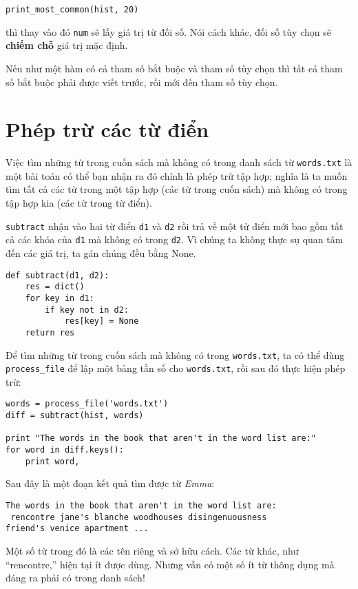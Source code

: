 \documentclass[11pt]{book}
\begin{document}
\beforeverb
\begin{verbatim}
print_most_common(hist, 20)
\end{verbatim}
\afterverb

thì thay vào đó {\tt num} sẽ lấy giá trị từ đối số. Nói cách khác,
đối số tùy chọn sẽ {\bf chiếm chỗ} giá trị mặc định.


Nếu như một hàm có cả tham số bắt buộc và tham số tùy chọn thì
tất cả tham số bắt buộc phải được viết trước, rồi mới đến tham số
tùy chọn.


\section{Phép trừ các từ điển}


Việc tìm những từ trong cuốn sách mà không có trong danh sách từ
{\tt words.txt} là một bài toán có thể bạn nhận ra đó chính là 
phép trừ tập hợp; nghĩa là ta muốn tìm tất cả các từ trong một 
tập hợp (các từ trong cuốn sách) mà không có trong tập hợp kia
(các từ trong từ điển).

{\tt subtract} nhận vào hai từ điển {\tt d1} và {\tt d2} rồi trả về
một tử điển mới bao gồm tất cả các khóa của {\tt d1} mà không có
trong {\tt d2}.  Vì chúng ta không thực sụ quan tâm đến các 
giá trị, ta gán chúng đều bằng None.

\beforeverb
\begin{verbatim}
def subtract(d1, d2):
    res = dict()
    for key in d1:
        if key not in d2:
            res[key] = None
    return res
\end{verbatim}
\afterverb
%
Để tìm những từ trong cuốn sách mà không có trong {\tt words.txt},
ta có thể dùng \verb"process_file" để lập một bảng tần số cho
{\tt words.txt}, rồi sau đó thực hiện phép trừ:

\beforeverb
\begin{verbatim}
words = process_file('words.txt')
diff = subtract(hist, words)

print "The words in the book that aren't in the word list are:"
for word in diff.keys():
    print word,
\end{verbatim}
\afterverb
%
Sau đây là một đoạn kết quả tìm được từ {\em Emma}:

\beforeverb
\begin{verbatim}
The words in the book that aren't in the word list are:
 rencontre jane's blanche woodhouses disingenuousness 
friend's venice apartment ...
\end{verbatim}
\afterverb
%
Một số từ trong đó là các tên riêng và sở hữu cách. Các từ khác,
như ``rencontre,'' hiện tại ít được dùng. Nhưng vẫn có một số ít từ
thông dụng mà đáng ra phải có trong danh sách!
\end{document}
